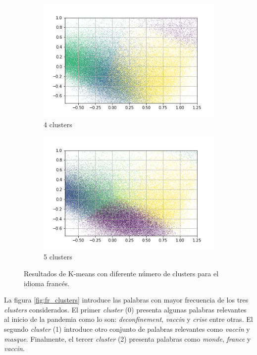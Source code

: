 \begin{figure}
\begin{subfigure}[b]{0.4\textwidth}
         \includegraphics[width=\textwidth]{results/TopicDetection/fr/PCA_4.png}
         \caption{4 clusters}
         \label{fig:fr_kmeans_4}
     \end{subfigure}
     \hfill
     \begin{subfigure}[b]{0.4\textwidth}
         \centering
         \includegraphics[width=\textwidth]{results/TopicDetection/fr/PCA_5.png}
         \caption{5 clusters}
         \label{fig:fr_kmeans_5}
     \end{subfigure}
        \caption{Resultados de K-means con diferente número de clusters para el idioma francés.}
        \label{fig:fr_kmeans}
\end{figure}

La figura \ref{fig:fr_clusters} introduce las palabras con mayor frecuencia de los tres \textit{clusters} considerados. El primer \textit{cluster} (0) presenta algunas palabras relevantes al inicio de la pandemia como lo son: \textit{deconfinement}, \textit{vaccin} y \textit{crise} entre otras. El segundo \textit{cluster} (1) introduce otro conjunto de palabras relevantes como \textit{vaccin} y \textit{masque}. Finalmente, el tercer \textit{cluster} (2) presenta palabras como \textit{monde}, \textit{france} y \textit{vaccin}. 

